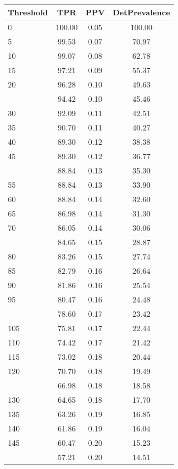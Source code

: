 \begin{table}[ht]
\centering
\begin{tabular}{lccc}
  \toprule
Threshold & TPR & PPV & DetPrevalence \\ 
  \midrule
0 & 100.00 & 0.05 & 100.00 \\ 
  5 & 99.53 & 0.07 & 70.97 \\ 
  10 & 99.07 & 0.08 & 62.78 \\ 
  15 & 97.21 & 0.09 & 55.37 \\ 
  20 & 96.28 & 0.10 & 49.63 \\ 
   \addlinespace
25 & 94.42 & 0.10 & 45.46 \\ 
  30 & 92.09 & 0.11 & 42.51 \\ 
  35 & 90.70 & 0.11 & 40.27 \\ 
  40 & 89.30 & 0.12 & 38.38 \\ 
  45 & 89.30 & 0.12 & 36.77 \\ 
   \addlinespace
50 & 88.84 & 0.13 & 35.30 \\ 
  55 & 88.84 & 0.13 & 33.90 \\ 
  60 & 88.84 & 0.14 & 32.60 \\ 
  65 & 86.98 & 0.14 & 31.30 \\ 
  70 & 86.05 & 0.14 & 30.06 \\ 
   \addlinespace
75 & 84.65 & 0.15 & 28.87 \\ 
  80 & 83.26 & 0.15 & 27.74 \\ 
  85 & 82.79 & 0.16 & 26.64 \\ 
  90 & 81.86 & 0.16 & 25.54 \\ 
  95 & 80.47 & 0.16 & 24.48 \\ 
   \addlinespace
100 & 78.60 & 0.17 & 23.42 \\ 
  105 & 75.81 & 0.17 & 22.44 \\ 
  110 & 74.42 & 0.17 & 21.42 \\ 
  115 & 73.02 & 0.18 & 20.44 \\ 
  120 & 70.70 & 0.18 & 19.49 \\ 
   \addlinespace
125 & 66.98 & 0.18 & 18.58 \\ 
  130 & 64.65 & 0.18 & 17.70 \\ 
  135 & 63.26 & 0.19 & 16.85 \\ 
  140 & 61.86 & 0.19 & 16.04 \\ 
  145 & 60.47 & 0.20 & 15.23 \\ 
   \addlinespace
150 & 57.21 & 0.20 & 14.51 \\ 

\end{tabular}
\end{table}
